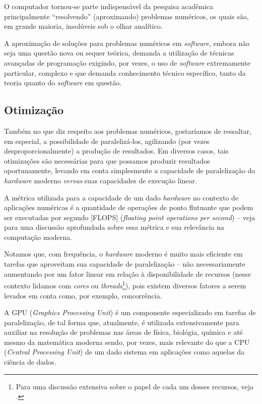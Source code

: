 \documentclass[10pt, a4paper, conference, onecolumn]{IEEEtran}
\begin{document}
O computador tornou-se parte indispensável da pesquisa acadêmica principalmente
``resolvendo'' (aproximando) problemas numéricos, os quais são, em grande
maioria, insolúveis sob o olhar analítico.

A aproximação de soluções para problemas numéricos em \textit{software}, embora
não seja uma questão nova ou sequer teórica, demanda a utilização de técnicas
avançadas de programação exigindo, por vezes, o uso de \textit{software}
extremamente particular, complexo e que demanda conhecimento técnico
específico, tanto da teoria quanto do \textit{software} em questão.

\subsection{Otimização}

Também no que diz respeito aos problemas numéricos, gostaríamos de ressaltar,
em especial, a possibilidade de paralelizá-los, agilizando (por vezes
desproporcionalmente) a produção de resultados. Em diversos casos, tais
otimizações são necessárias para que possamos produzir resultados
oportunamente, levando em conta simplesmente a capacidade de paralelização do
\textit{hardware} moderno \textit{versus} suas capacidades de execução linear.

A métrica utilizada para a capacidade de um dado \textit{hardware} no contexto
de aplicações numéricas é a quantidade de operações de ponto flutuante que
podem ser executadas por segundo [FLOPS] (\textit{floating point operations per
second}) -- veja \cite{dolbeau2018theoretical, sun2019summarizing} para uma
discussão aprofundada sobre essa métrica e sua relevância na computação
moderna.

Notamos que, com frequência, o \textit{hardware} moderno é muito mais eficiente
em tarefas que aproveitam sua capacidade de paralelização
\cite{doi2018performance} -- não necessariamente aumentando por um fator linear
em relação à disponibilidade de recursos (nesse contexto lidamos com
\textit{cores} ou \textit{threads}\footnote{ Para uma discussão extensiva sobre
o papel de cada um desses recursos, veja \cite{magro2002hyper}. }), pois
existem diversos fatores a serem levados em conta como, por exemplo,
concorrência\cite{zhou2005improving}.

A GPU (\textit{Graphics Processing Unit}) é um componente especializado em
tarefas de paralelização, de tal forma que, atualmente, é utilizada
extensivamente para auxiliar na resolução de problemas nas áreas de física,
biológia, química e até mesmo da matemática moderna sendo, por vezes, mais
relevante do que a CPU (\textit{Central Processing
Unit}) de um dado sistema em aplicações como aquelas
da ciência de dados\cite{buber2018performance}.
\end{document}
